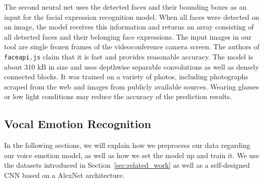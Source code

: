 The second neural net uses the detected faces and their bounding boxes as an input for the facial expression recognition model. When all faces were detected on an image, the model receives this information and returns an array consisting of all detected faces and their belonging face expressions. The input images in our tool are single frozen frames of the videoconference camera screen. The authors of \texttt{faceapi.js} claim that it is fast and provides reasonable accuracy. The model is about 310 kB in size and uses depthwise separable convolutions as well as densely connected blocks. It was trained on a variety of photos, including photographs scraped from the web and images from publicly available sources. Wearing glasses or low light conditions may reduce the accuracy of the prediction results.

\subsection{Vocal Emotion Recognition}
\label{subsec:method_vocal_emotion_recognition}
In the following sections, we will explain how we preprocess our data regarding our voice emotion model, as well as how we set the model up and train it. We use the datasets introduced in Section~\ref{sec:related_work} as well as a self-designed CNN based on a AlexNet architecture.

